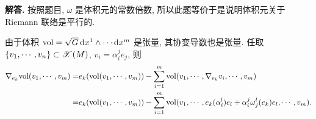 \documentclass{ctexart}
\newenvironment{solution}{\par\noindent\textbf{解答. }}{\par}
\begin{document}
\begin{solution}
    按照题目, $\omega$ 是体积元的常数倍数, 所以此题等价于是说明体积元关于 Riemann 联络是平行的.

    由于体积 $\mathrm{vol} = \sqrt{G}\mathop{}\!\mathrm{d} x^1 \wedge \cdots \mathop{}\!\mathrm{d} x^m$ 是张量, 其协变导数也是张量. 任取 $\{v_1, \cdots, v_n\} \subset \mathscr{X}(M)$, $v_i = \alpha^{j}_{i}e_j$, 则
    \[
        \begin{aligned}
            \nabla_{e_k}\mathrm{vol}(v_1, \cdots, v_m)
            =& e_k(\mathrm{vol}(v_1, \cdots, v_m)) - \sum_{i = 1}^{m}\mathrm{vol}(v_1, \cdots, \nabla_{e_k}{v_i}, \cdots, v_m) \\
            =& e_k(\mathrm{vol}(v_1, \cdots, v_m)) - \sum_{i = 1}^{m}\mathrm{vol}(v_1, \cdots, e_k(\alpha^{l}_{i})e_l + \alpha^{j}_{i}\omega^{l}_{j}(e_k)e_l, \cdots, v_m).
        \end{aligned}
    \]


\end{solution}
\end{document}
